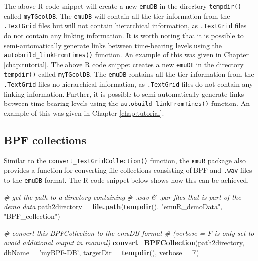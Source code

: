 \documentclass[]{book}
\newenvironment{Shaded}{\begin{snugshade}}{\end{snugshade}}
\newcommand{\CommentTok}[1]{\textcolor[rgb]{0.56,0.35,0.01}{\textit{#1}}}
\newcommand{\DataTypeTok}[1]{\textcolor[rgb]{0.13,0.29,0.53}{#1}}
\newcommand{\KeywordTok}[1]{\textcolor[rgb]{0.13,0.29,0.53}{\textbf{#1}}}
\newcommand{\NormalTok}[1]{#1}
\newcommand{\StringTok}[1]{\textcolor[rgb]{0.31,0.60,0.02}{#1}}
\begin{document}
The above R code snippet will create a new \texttt{emuDB} in the directory \texttt{tempdir()} called \texttt{myTGcolDB}. The \texttt{emuDB} will contain all the tier information from the \texttt{.TextGrid} files but will not contain hierarchical information, as \texttt{.TextGrid} files do not contain any linking information. It is worth noting that it is possible to semi-automatically generate links between time-bearing levels using the \texttt{autobuild\_linkFromTimes()} function. An example of this was given in Chapter \ref{chap:tutorial}.
The above R code snippet creates a new \texttt{emuDB} in the directory \texttt{tempdir()} called \texttt{myTGcolDB}. The \texttt{emuDB} contains all the tier information from the \texttt{.TextGrid} files no hierarchical information, as \texttt{.TextGrid} files do not contain any linking information. Further, it is possible to semi-automatically generate links between time-bearing levels using the \texttt{autobuild\_linkFromTimes()} function. An example of this was given in Chapter \ref{chap:tutorial}.

\hypertarget{bpf-collections}{%
\subsection{BPF collections}\label{bpf-collections}}

Similar to the \texttt{convert\_TextGridCollection()} function, the \texttt{emuR} package also provides a function for converting file collections consisting of BPF and \texttt{.wav} files to the \texttt{emuDB} format. The R code snippet below shows how this can be achieved.

\begin{Shaded}
\begin{Highlighting}[]
\CommentTok{# get the path to a directory containing}
\CommentTok{# .wav & .par files that is part of the demo data}
\NormalTok{path2directory =}\StringTok{ }\KeywordTok{file.path}\NormalTok{(}\KeywordTok{tempdir}\NormalTok{(),}
                           \StringTok{"emuR_demoData"}\NormalTok{,}
                           \StringTok{"BPF_collection"}\NormalTok{)}

\CommentTok{# convert this BPFCollection to the emuDB format}
\CommentTok{# (verbose = F is only set to avoid additional output in manual)}
\KeywordTok{convert_BPFCollection}\NormalTok{(path2directory, }
                      \DataTypeTok{dbName =} \StringTok{'myBPF-DB'}\NormalTok{,}
                      \DataTypeTok{targetDir =} \KeywordTok{tempdir}\NormalTok{(), }
                      \DataTypeTok{verbose =}\NormalTok{ F)}
\end{Highlighting}
\end{Shaded}
\end{document}
